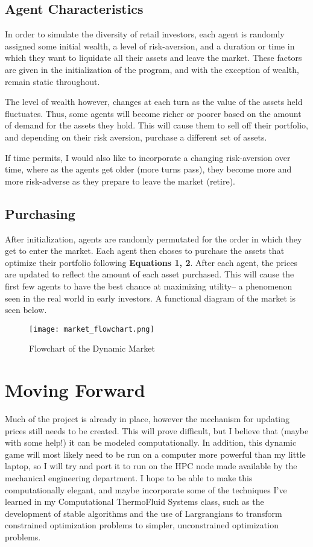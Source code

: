 \documentclass{article}
\begin{document}
\subsection{Agent Characteristics}
In order to simulate the diversity of retail investors, each agent is randomly assigned some initial wealth, a level of risk-aversion, and a duration or time in which they want to liquidate all their assets and leave the market. These factors are given in the initialization of the program, and with the exception of wealth, remain static throughout. \*

The level of wealth however, changes at each turn as the value of the assets held fluctuates. Thus, some agents will become richer or poorer based on the amount of demand for the assets they hold. This will cause them to sell off their portfolio, and depending on their risk aversion, purchase a different set of assets. \*

If time permits, I would also like to incorporate a changing risk-aversion over time, where as the agents get older (more turns pass), they become more and more risk-adverse as they prepare to leave the market (retire). 

\subsection{Purchasing}
After initialization, agents are randomly permutated for the order in which they get to enter the market. Each agent then choses to purchase the assets that optimize their portfolio following {\bf Equations 1, 2}. After each agent, the prices are updated to reflect the amount of each asset purchased. This will cause the first few agents to have the best chance at maximizing utility-- a phenomenon seen in the real world in early investors. A functional diagram of the market is seen below.   

\begin{figure}[H]
	\begin{center}
		\texttt{[image: market\_flowchart.png]}
		\caption{Flowchart of the Dynamic Market}
	\end{center}
\end{figure}

\section{Moving Forward}
Much of the project is already in place, however the mechanism for updating prices still needs to be created. This will prove difficult, but I believe that (maybe with some help!) it can be modeled computationally. In addition, this dynamic game will most likely need to be run on a computer more powerful than my little laptop, so I will try and port it to run on the HPC node made available by the mechanical engineering department. I hope to be able to make this computationally elegant, and maybe incorporate some of the techniques I've learned in my Computational ThermoFluid Systems class, such as the development of stable algorithms and the use of Largrangians to transform constrained optimization problems to simpler, unconstrained optimization problems. 
\end{document}
